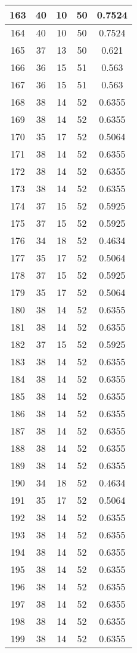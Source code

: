 \documentclass[letterpaper, 12pt]{article}
\begin{document}
\begin{longtable}{|c|c|c|c|c|}
\hline
163 & 40 & 10 & 50 & 0.7524 \\
\hline
164 & 40 & 10 & 50 & 0.7524 \\
\hline
165 & 37 & 13 & 50 & 0.621 \\
\hline
166 & 36 & 15 & 51 & 0.563 \\
\hline
167 & 36 & 15 & 51 & 0.563 \\
\hline
168 & 38 & 14 & 52 & 0.6355 \\
\hline
169 & 38 & 14 & 52 & 0.6355 \\
\hline
170 & 35 & 17 & 52 & 0.5064 \\
\hline
171 & 38 & 14 & 52 & 0.6355 \\
\hline
172 & 38 & 14 & 52 & 0.6355 \\
\hline
173 & 38 & 14 & 52 & 0.6355 \\
\hline
174 & 37 & 15 & 52 & 0.5925 \\
\hline
175 & 37 & 15 & 52 & 0.5925 \\
\hline
176 & 34 & 18 & 52 & 0.4634 \\
\hline
177 & 35 & 17 & 52 & 0.5064 \\
\hline
178 & 37 & 15 & 52 & 0.5925 \\
\hline
179 & 35 & 17 & 52 & 0.5064 \\
\hline
180 & 38 & 14 & 52 & 0.6355 \\
\hline
181 & 38 & 14 & 52 & 0.6355 \\
\hline
182 & 37 & 15 & 52 & 0.5925 \\
\hline
183 & 38 & 14 & 52 & 0.6355 \\
\hline
184 & 38 & 14 & 52 & 0.6355 \\
\hline
185 & 38 & 14 & 52 & 0.6355 \\
\hline
186 & 38 & 14 & 52 & 0.6355 \\
\hline
187 & 38 & 14 & 52 & 0.6355 \\
\hline
188 & 38 & 14 & 52 & 0.6355 \\
\hline
189 & 38 & 14 & 52 & 0.6355 \\
\hline
190 & 34 & 18 & 52 & 0.4634 \\
\hline
191 & 35 & 17 & 52 & 0.5064 \\
\hline
192 & 38 & 14 & 52 & 0.6355 \\
\hline
193 & 38 & 14 & 52 & 0.6355 \\
\hline
194 & 38 & 14 & 52 & 0.6355 \\
\hline
195 & 38 & 14 & 52 & 0.6355 \\
\hline
196 & 38 & 14 & 52 & 0.6355 \\
\hline
197 & 38 & 14 & 52 & 0.6355 \\
\hline
198 & 38 & 14 & 52 & 0.6355 \\
\hline
199 & 38 & 14 & 52 & 0.6355 \\
\hline
\end{longtable}
\end{document}
